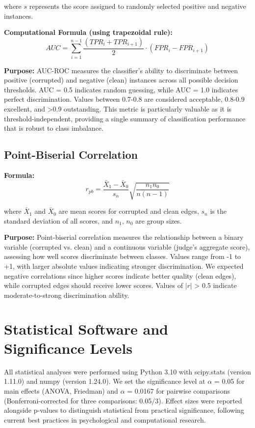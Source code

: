 where $s$ represents the score assigned to randomly selected positive and negative instances.

\textbf{Computational Formula (using trapezoidal rule):}
\begin{equation}
AUC = \sum_{i=1}^{n-1} \frac{(TPR_i + TPR_{i+1})}{2} \cdot (FPR_i - FPR_{i+1})
\end{equation}

\textbf{Purpose:} AUC-ROC measures the classifier's ability to discriminate between positive (corrupted) and negative (clean) instances across all possible decision thresholds. AUC = 0.5 indicates random guessing, while AUC = 1.0 indicates perfect discrimination. Values between 0.7-0.8 are considered acceptable, 0.8-0.9 excellent, and >0.9 outstanding. This metric is particularly valuable as it is threshold-independent, providing a single summary of classification performance that is robust to class imbalance.

\subsection{Point-Biserial Correlation}

\textbf{Formula:}
\begin{equation}
r_{pb} = \frac{\bar{X}_1 - \bar{X}_0}{s_n} \sqrt{\frac{n_1 n_0}{n(n-1)}}
\end{equation}

where $\bar{X}_1$ and $\bar{X}_0$ are mean scores for corrupted and clean edges, $s_n$ is the standard deviation of all scores, and $n_1$, $n_0$ are group sizes.

\textbf{Purpose:} Point-biserial correlation measures the relationship between a binary variable (corrupted vs. clean) and a continuous variable (judge's aggregate score), assessing how well scores discriminate between classes. Values range from -1 to +1, with larger absolute values indicating stronger discrimination. We expected negative correlations since higher scores indicate better quality (clean edges), while corrupted edges should receive lower scores. Values of $|r|$ > 0.5 indicate moderate-to-strong discrimination ability.

\section{Statistical Software and Significance Levels}

All statistical analyses were performed using Python 3.10 with scipy.stats (version 1.11.0) and numpy (version 1.24.0). We set the significance level at $\alpha$ = 0.05 for main effects (ANOVA, Friedman) and $\alpha$ = 0.0167 for pairwise comparisons (Bonferroni-corrected for three comparisons: 0.05/3). Effect sizes were reported alongside p-values to distinguish statistical from practical significance, following current best practices in psychological and computational research.

